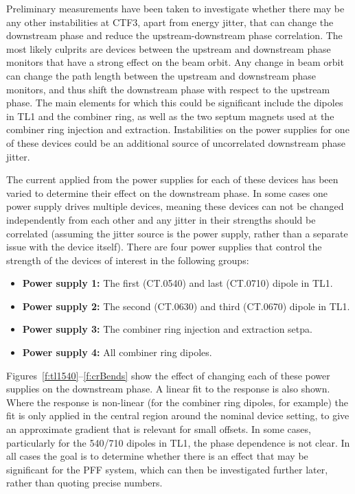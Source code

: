 Preliminary measurements have been taken to investigate whether there may be any other instabilities at CTF3, apart from energy jitter, that can change the downstream phase and reduce the upstream-downstream phase correlation. The most likely culprits are devices between the upstream and downstream phase monitors that have a strong effect on the beam orbit. Any change in beam orbit can change the path length between the upstream and downstream phase monitors, and thus shift the downstream phase with respect to the upstream phase. The main elements for which this could be significant include the dipoles in TL1 and the combiner ring, as well as the two septum magnets used  at the combiner ring injection and extraction. Instabilities on the power supplies for one of these devices could be an additional source of uncorrelated downstream phase jitter.

The current applied from the power supplies for each of these devices has been varied to determine their effect on the downstream phase. In some cases one power supply drives multiple devices, meaning these devices can not be changed independently from each other and any jitter in their strengths should be correlated (assuming the jitter source is the power supply, rather than a separate issue with the device itself). There are four power supplies that control the strength of the devices of interest in the following groups:
\begin{itemize}
\item \textbf{Power supply 1:} The first (CT.0540) and last (CT.0710) dipole in TL1.
\item \textbf{Power supply 2:} The second (CT.0630) and third (CT.0670) dipole in TL1.
\item \textbf{Power supply 3:} The combiner ring injection and extraction setpa.
\item \textbf{Power supply 4:} All combiner ring dipoles.
\end{itemize}
Figures~\ref{f:tl1540}--\ref{f:crBends} show the effect of changing each of these power supplies on the downstream phase. A linear fit to the response is also shown. Where the response is non-linear (for the combiner ring dipoles, for example) the fit is only applied in the central region around the nominal device setting, to give an approximate gradient that is relevant for small offsets. In some cases, particularly for the 540/710 dipoles in TL1, the phase dependence is not clear. In all cases the goal is to determine whether there is an effect that may be significant for the PFF system, which can then be investigated further later, rather than quoting precise numbers.

